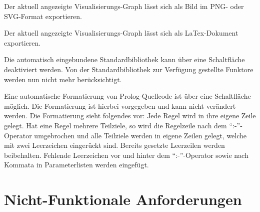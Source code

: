 \documentclass[parskip=full,11pt,twoside]{scrartcl}
\begin{document}

Der aktuell angezeigte Visualisierungs-Graph lässt sich als Bild im PNG- oder SVG-Format exportieren.


Der aktuell angezeigte Visualisierungs-Graph lässt sich als LaTex-Dokument exportieren.


Die automatisch eingebundene Standardbibliothek kann über eine Schaltfläche deaktiviert werden. Von der Standardbibliothek zur Verfügung gestellte Funktore werden nun nicht mehr berücksichtigt.


Eine automatische Formatierung von Prolog-Quellcode ist über eine Schaltfläche möglich. Die Formatierung ist hierbei vorgegeben und kann nicht verändert werden. Die Formatierung sieht folgendes vor: Jede Regel wird in ihre eigene Zeile gelegt. Hat eine Regel mehrere Teilziele, so wird die Regelzeile nach dem \enquote{:-}-Operator umgebrochen und alle Teilziele werden in eigene Zeilen gelegt, welche mit zwei Leerzeichen eingerückt sind. Bereits gesetzte Leerzeilen werden beibehalten. Fehlende Leerzeichen vor und hinter dem \enquote{:-}-Operator sowie nach Kommata in Parameterlisten werden eingefügt.



\section{Nicht-Funktionale Anforderungen}


\end{document}

